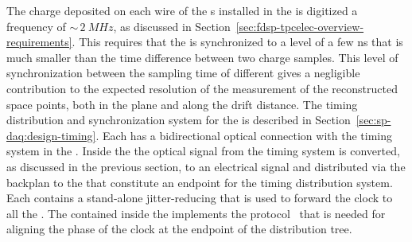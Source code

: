 The charge deposited on each wire of the s installed 
in the   is digitized a frequency of
$\sim\,\SI{2}{MHz}$, as discussed in 
Section~\ref{sec:fdsp-tpcelec-overview-requirements}. This requires
that the  is synchronized to a level of a few ns that is
much smaller than the time difference between two charge samples.
This level of synchronization between the sampling time of different
 gives a negligible contribution to the expected
resolution of the measurement of the reconstructed space points,
both in the  plane and along the drift distance.
The timing distribution and synchronization system for the
  is described in Section~\ref{sec:sp-daq:design-timing}.
Each  has a bidirectional optical connection with the
timing system in the . Inside the  the optical
signal from the timing system is converted, as discussed in the previous
section, to an electrical signal and distributed via the backplan to
the  that constitute an endpoint for the timing distribution
system. Each  contains a stand-alone jitter-reducing  
that is used to forward the clock to all the . The
 contained inside the  implements the 
protocol~\cite{docdb-1651,docdb-11233} that is needed for aligning
the phase of the clock at the endpoint of the distribution tree.


